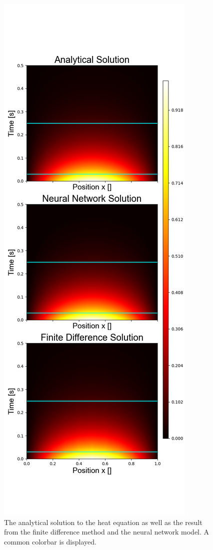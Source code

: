 
\begin{figure}[h!]
    \centering
    \includegraphics[width=1.0\linewidth]{project_3/plots/heat_map_comparison.png}
    \caption{The analytical solution to the heat equation as well as the result from the finite difference method and the neural network model. A common colorbar is displayed. }
    \label{fig:heatmaps}
\end{figure}

